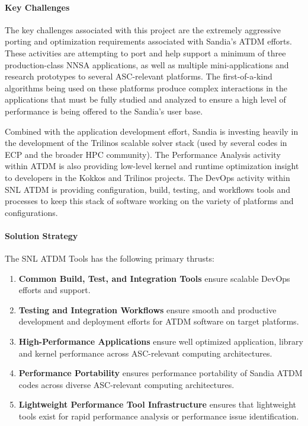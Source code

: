 \paragraph{Key Challenges}

The key challenges associated with this project are the extremely aggressive porting and optimization requirements associated with Sandia's ATDM efforts.
These activities are attempting to port and help support a minimum of three production-class NNSA applications, as well as multiple mini-applications and research prototypes to several ASC-relevant platforms. The first-of-a-kind algorithms being used on these platforms produce complex interactions in the applications that must be fully studied and analyzed to ensure a high level of performance is being offered to the Sandia's user base.

Combined with the application development effort, Sandia is investing heavily in the development of the Trilinos scalable solver stack (used by several codes in ECP and the broader HPC community). The Performance Analysis activity within ATDM is also providing low-level kernel and runtime optimization insight to developers in the Kokkos and Trilinos projects. The DevOps activity within SNL ATDM is providing configuration, build, testing, and workflows tools and processes to keep this stack of software working on the variety of platforms and configurations.

\paragraph{Solution Strategy}

The SNL ATDM Tools has the following primary thrusts:

\begin{enumerate}

\item \textbf{Common Build, Test, and Integration Tools} ensure scalable DevOps efforts and support.

\item \textbf{Testing and Integration Workflows} ensure smooth and productive development and deployment efforts for ATDM software on target platforms.

\item \textbf{High-Performance Applications} ensure well optimized application, library and kernel performance across ASC-relevant computing architectures.

\item \textbf{Performance Portability} ensures performance portability of Sandia ATDM codes across diverse ASC-relevant computing architectures.

\item \textbf{Lightweight Performance Tool Infrastructure} ensures that lightweight tools exist for rapid performance analysis or performance issue identification.

\end{enumerate}

